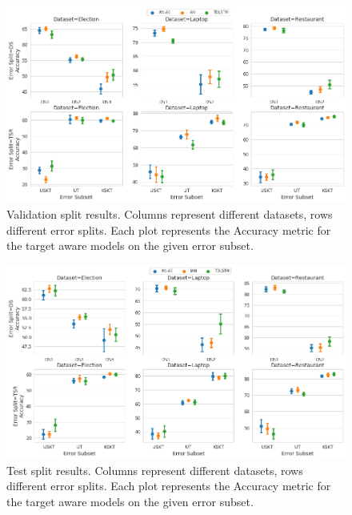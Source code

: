 \begin{figure}[!h]
    \centering
    \includegraphics[scale=0.3]{images/augmentation/methods_performance/Inter_Target/inter_target_encoding_split_overall_validation.png}
    \caption{Validation split results. Columns represent different datasets, rows different error splits. Each plot represents the Accuracy metric for the target aware models on the given error subset.}
    \label{fig:aug_inter_target_encoding_split_overall_validation}
\end{figure}

\begin{figure}[!h]
    \centering
    \includegraphics[scale=0.3]{images/augmentation/methods_performance/Inter_Target/inter_target_encoding_split_overall_test.png}
    \caption{Test split results. Columns represent different datasets, rows different error splits. Each plot represents the Accuracy metric for the target aware models on the given error subset.}
    \label{fig:aug_inter_target_encoding_split_overall_test}
\end{figure}


